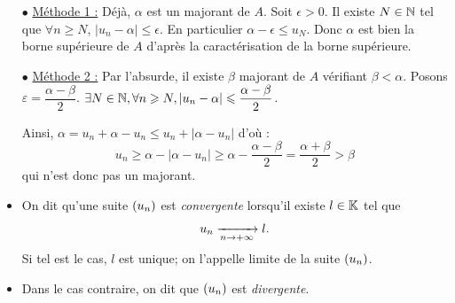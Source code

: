 \documentclass{magnolia}
\begin{document}

\begin{sol}
\begin{itemize}
\item[$\bullet$] \underline{Méthode 1 :} Déjà, $\alpha$ est un majorant de $A$. Soit $\epsilon>0$. Il existe $N\in \mathbb{N}$ tel que $\forall n\geq N$, $|u_n-\alpha|\leq \epsilon$. En particulier $\alpha-\epsilon \leq u_N$. Donc $\alpha$ est bien la borne supérieure de $A$ d'après la caractérisation de la borne supérieure.
\item[$\bullet$] \underline{Méthode 2 :} Par l'absurde, il existe $\beta$ majorant de $A$ vérifiant $\beta<\alpha$. Posons $\varepsilon=\dfrac{\alpha-\beta}{2}$. $\exists N \in \mathbb{N}, \forall n\geqslant N, |u_n-\alpha|\leqslant \dfrac{\alpha-\beta}{2}$.

Ainsi, $\alpha=u_n+\alpha-u_n\leq u_n+|\alpha-u_n|$ d'où :
\[u_n\geq \alpha-|\alpha-u_n|\geq \alpha-\dfrac{\alpha-\beta}{2}=\dfrac{\alpha+\beta}{2}>\beta\] qui n'est donc pas un majorant.
\end{itemize}
\end{sol}


\begin{definition}[utile=-3]
\begin{itemize}
\item On dit qu'une suite $\left(u_n\right)$ est \emph{convergente} lorsqu'il existe $l\in\mathbb{K}$
  tel que
  \[u_n\xrightarrow[n\rightarrow +\infty]{} l.\]
  Si tel est le cas, $l$ est unique; on l'appelle limite de la suite $\left(u_n\right)$.
\item Dans le cas contraire, on dit que $\left(u_n\right)$ est \emph{divergente}.
\end{itemize}
\end{definition}
\end{document}
